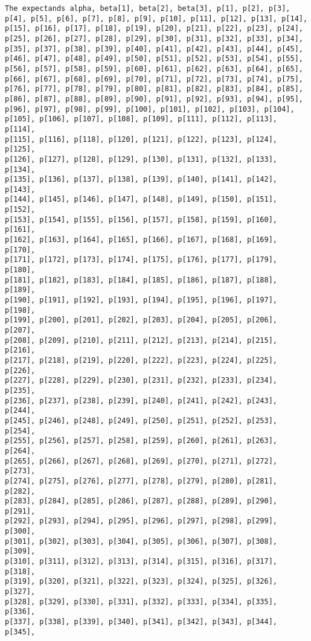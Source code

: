 \documentclass[
  letterpaper,
  DIV=11,
  numbers=noendperiod]{scrartcl}
\begin{document}
\begin{verbatim}
The expectands alpha, beta[1], beta[2], beta[3], p[1], p[2], p[3],
p[4], p[5], p[6], p[7], p[8], p[9], p[10], p[11], p[12], p[13], p[14],
p[15], p[16], p[17], p[18], p[19], p[20], p[21], p[22], p[23], p[24],
p[25], p[26], p[27], p[28], p[29], p[30], p[31], p[32], p[33], p[34],
p[35], p[37], p[38], p[39], p[40], p[41], p[42], p[43], p[44], p[45],
p[46], p[47], p[48], p[49], p[50], p[51], p[52], p[53], p[54], p[55],
p[56], p[57], p[58], p[59], p[60], p[61], p[62], p[63], p[64], p[65],
p[66], p[67], p[68], p[69], p[70], p[71], p[72], p[73], p[74], p[75],
p[76], p[77], p[78], p[79], p[80], p[81], p[82], p[83], p[84], p[85],
p[86], p[87], p[88], p[89], p[90], p[91], p[92], p[93], p[94], p[95],
p[96], p[97], p[98], p[99], p[100], p[101], p[102], p[103], p[104],
p[105], p[106], p[107], p[108], p[109], p[111], p[112], p[113], p[114],
p[115], p[116], p[118], p[120], p[121], p[122], p[123], p[124], p[125],
p[126], p[127], p[128], p[129], p[130], p[131], p[132], p[133], p[134],
p[135], p[136], p[137], p[138], p[139], p[140], p[141], p[142], p[143],
p[144], p[145], p[146], p[147], p[148], p[149], p[150], p[151], p[152],
p[153], p[154], p[155], p[156], p[157], p[158], p[159], p[160], p[161],
p[162], p[163], p[164], p[165], p[166], p[167], p[168], p[169], p[170],
p[171], p[172], p[173], p[174], p[175], p[176], p[177], p[179], p[180],
p[181], p[182], p[183], p[184], p[185], p[186], p[187], p[188], p[189],
p[190], p[191], p[192], p[193], p[194], p[195], p[196], p[197], p[198],
p[199], p[200], p[201], p[202], p[203], p[204], p[205], p[206], p[207],
p[208], p[209], p[210], p[211], p[212], p[213], p[214], p[215], p[216],
p[217], p[218], p[219], p[220], p[222], p[223], p[224], p[225], p[226],
p[227], p[228], p[229], p[230], p[231], p[232], p[233], p[234], p[235],
p[236], p[237], p[238], p[239], p[240], p[241], p[242], p[243], p[244],
p[245], p[246], p[248], p[249], p[250], p[251], p[252], p[253], p[254],
p[255], p[256], p[257], p[258], p[259], p[260], p[261], p[263], p[264],
p[265], p[266], p[267], p[268], p[269], p[270], p[271], p[272], p[273],
p[274], p[275], p[276], p[277], p[278], p[279], p[280], p[281], p[282],
p[283], p[284], p[285], p[286], p[287], p[288], p[289], p[290], p[291],
p[292], p[293], p[294], p[295], p[296], p[297], p[298], p[299], p[300],
p[301], p[302], p[303], p[304], p[305], p[306], p[307], p[308], p[309],
p[310], p[311], p[312], p[313], p[314], p[315], p[316], p[317], p[318],
p[319], p[320], p[321], p[322], p[323], p[324], p[325], p[326], p[327],
p[328], p[329], p[330], p[331], p[332], p[333], p[334], p[335], p[336],
p[337], p[338], p[339], p[340], p[341], p[342], p[343], p[344], p[345],

\end{verbatim}
\end{document}
